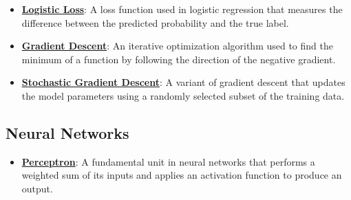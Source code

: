 \documentclass{article}%
\begin{document}
\begin{itemize}[leftmargin=*]
\item \href{\url{https://purdue.brightspace.com/d2l/common/assets/pdfjs-d2l-dist/1.0.14-legacy/web/viewer.html?file=\%252Fcontent\%252Fenforced\%252F1095467-wl.202510.CS.24300.001\%252F05L2-ML\%20Basics.pdf\%253Fou\%253D1095467\&lang=en-us\&container=d2l-fileviewer-rendered-pdf\&fullscreen=d2l-fileviewer-rendered-pdf-dialog\&height=667}#page=27}{\textbf{Logistic Loss}}: A loss function used in logistic regression that measures the difference between the predicted probability and the true label.%
\item \href{\url{https://purdue.brightspace.com/d2l/common/assets/pdfjs-d2l-dist/1.0.14-legacy/web/viewer.html?file=\%252Fcontent\%252Fenforced\%252F1095467-wl.202510.CS.24300.001\%252F05L2-ML\%20Basics.pdf\%253Fou\%253D1095467\&lang=en-us\&container=d2l-fileviewer-rendered-pdf\&fullscreen=d2l-fileviewer-rendered-pdf-dialog\&height=667}#page=28}{\textbf{Gradient Descent}}: An iterative optimization algorithm used to find the minimum of a function by following the direction of the negative gradient.%
\item \href{\url{https://purdue.brightspace.com/d2l/common/assets/pdfjs-d2l-dist/1.0.14-legacy/web/viewer.html?file=\%252Fcontent\%252Fenforced\%252F1095467-wl.202510.CS.24300.001\%252F05L2-ML\%20Basics.pdf\%253Fou\%253D1095467\&lang=en-us\&container=d2l-fileviewer-rendered-pdf\&fullscreen=d2l-fileviewer-rendered-pdf-dialog\&height=667}#page=29}{\textbf{Stochastic Gradient Descent}}: A variant of gradient descent that updates the model parameters using a randomly selected subset of the training data.%
\end{itemize}

%
\subsection{Neural Networks}%
\label{subsec:NeuralNetworks}%
\begin{itemize}[leftmargin=*]%
\item \href{\url{https://purdue.brightspace.com/d2l/common/assets/pdfjs-d2l-dist/1.0.14-legacy/web/viewer.html?file=\%252Fcontent\%252Fenforced\%252F1095467-wl.202510.CS.24300.001\%252F02L2-Intro.pdf\%253Fou\%253D1095467\&lang=en-us\&container=d2l-fileviewer-rendered-pdf\&fullscreen=d2l-fileviewer-rendered-pdf-dialog\&height=667}#page=45}{\textbf{Perceptron}}: A fundamental unit in neural networks that performs a weighted sum of its inputs and applies an activation function to produce an output.%
\end{itemize}
\end{document}
